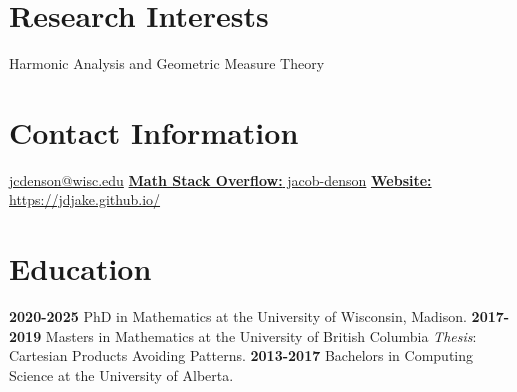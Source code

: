 \documentclass[a4paper]{cv-friggeri}
\begin{document}


\begin{aside} %
\section{Research Interests}
Harmonic Analysis and Geometric Measure Theory
~
\section{Contact Information}
\href{mailto:jcdenson@wisc.edu}{jcdenson@wisc.edu}
\href{https://math.stackexchange.com/users/120724/jacob-denson}{{\bf Math Stack Overflow:} jacob-denson}
\href{https://jdjake.github.io/}{{\bf Website:} https://jdjake.github.io/}
~
\section{Education}
{\bf 2020-2025}
PhD in Mathematics at the University of Wisconsin, Madison.
{\bf 2017-2019}
Masters in Mathematics at the University of British Columbia
\emph{Thesis}:\\Cartesian Products Avoiding Patterns.
{\bf 2013-2017}
Bachelors in Computing Science at the University of Alberta.
~

\end{aside}
\end{document}
